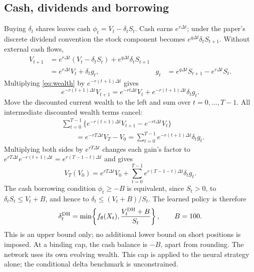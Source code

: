 \documentclass[11pt,a4paper]{article}
\newcommand{\dt}{\Delta t}
\theoremstyle{remark}
\begin{document}
\subsection{Cash, dividends and borrowing}
Buying $\delta_t$ shares leaves cash $\phi_t=V_t-\delta_tS_t$. Cash earns $e^{r\dt}$; under the paper's discrete dividend convention the stock component becomes $e^{q\dt}\delta_tS_{t+1}$. Without external cash flows,
\begin{align}
 V_{t+1}&=e^{r\dt}(V_t-\delta_tS_t)+e^{q\dt}\delta_tS_{t+1}\nonumber\\
 &=e^{r\dt}V_t+\delta_tg_t,
 &g_t&=e^{q\dt}S_{t+1}-e^{r\dt}S_t.
 \label{eq:wealth}
\end{align}
Multiplying \eqref{eq:wealth} by $e^{-r(t+1)\dt}$ gives
\begin{equation}
 e^{-r(t+1)\dt}V_{t+1}
 =e^{-rt\dt}V_t+e^{-r(t+1)\dt}\delta_tg_t.
\end{equation}
Move the discounted current wealth to the left and sum over $t=0,\ldots,T-1$. All intermediate discounted wealth terms cancel:
\begin{align}
 &\sum_{t=0}^{T-1}
  \{e^{-r(t+1)\dt}V_{t+1}-e^{-rt\dt}V_t\}\nonumber\\
 &\hspace{2em}=e^{-rT\dt}V_T-V_0
 =\sum_{t=0}^{T-1}e^{-r(t+1)\dt}\delta_tg_t.
\end{align}
Multiplying both sides by $e^{rT\dt}$ changes each gain's factor to
$e^{rT\dt}e^{-r(t+1)\dt}=e^{r(T-1-t)\dt}$ and gives
\begin{equation}
 V_T(V_0)=e^{rT\dt}V_0+
 \sum_{t=0}^{T-1}e^{r(T-1-t)\dt}\delta_tg_t.
 \label{eq:wealthsum}
\end{equation}
The cash borrowing condition $\phi_t\geq-B$ is equivalent, since $S_t>0$, to $\delta_tS_t\leq V_t+B$, and hence to $\delta_t\leq(V_t+B)/S_t$. The learned policy is therefore
\begin{equation}
 \delta_t^{\rm DH}=\min\!\left\{f_\theta(X_t),\frac{V_t^{\rm DH}+B}{S_t}\right\},
 \qquad B=100.
 \label{eq:cap}
\end{equation}
This is an upper bound only; no additional lower bound on short positions is imposed. At a binding cap, the cash balance is $-B$, apart from rounding. The network uses its own evolving wealth. This cap is applied to the neural strategy alone; the conditional delta benchmark is unconstrained.
\end{document}
